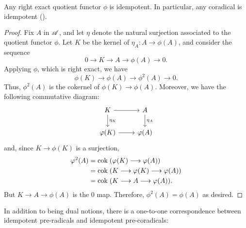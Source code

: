 \begin{prop}\label{prop_idempotence}
Any right exact quotient functor $\phi$ is idempotent. In 
particular, any coradical is idempotent (\CF \cite[I2.2]{BJV}).
\end{prop}
\begin{proof}
Fix $A$ in $\mathscr{A}$, and let $\eta$ denote the natural surjection 
associated to the quotient functor $\phi$. Let $K$ be the kernel 
of $\eta_A: A \to \phi(A)$, and consider the sequence
\[
0 \to K \to A \to \phi(A) \to 0.
\]
Applying $\phi$, which is right exact, we have
\[
\phi(K) \to \phi(A) \to \phi^2(A) \to 0.
\]
Thus, $\phi^2(A)$ is the cokernel of $\phi(K) \to \phi(A)$. Moreover,
we have the following commutative diagram:
\[
\begin{tikzcd}
K \arrow{r} \arrow{d}{\eta_K} &
A \arrow{d}{\eta_A} \\
\phi(K) \arrow{r} &
\phi(A)
\end{tikzcd}
\]
and, since $K \to \phi(K)$ is a surjection,
\begin{align*}
\varphi^2(A) &= \mathrm{cok}\; (\varphi(K) \longrightarrow \varphi(A)) \\
          &= \mathrm{cok}\; (K \longrightarrow \varphi(K) \longrightarrow \varphi(A)) \\
          &= \mathrm{cok}\; (K \longrightarrow A \longrightarrow \varphi(A)).
\end{align*}
But $K \to A \to \phi(A)$ is the $0$ map. Therefore, $\phi^2(A) = 
\phi(A)$ as desired.
\end{proof}

In addition to being dual notions, there is a one-to-one 
correspondence between idempotent pre-radicals and
idempotent pre-coradicals:

